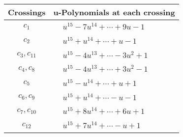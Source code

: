 \documentclass[1p]{elsarticle_modified}
\theoremstyle{definition}
\begin{document}
\begin{tabular}{m{50pt}|m{274pt}}
Crossings & \hspace{64pt}u-Polynomials at each crossing \\
\hline $$\begin{aligned}c_{1}\end{aligned}$$&$\begin{aligned}
&u^{15}-7 u^{14}+\cdots+9 u-1
\end{aligned}$\\
\hline $$\begin{aligned}c_{2}\end{aligned}$$&$\begin{aligned}
&u^{15}+u^{14}+\cdots+u-1
\end{aligned}$\\
\hline $$\begin{aligned}c_{3},c_{11}\end{aligned}$$&$\begin{aligned}
&u^{15}-4 u^{13}+\cdots-3 u^2+1
\end{aligned}$\\
\hline $$\begin{aligned}c_{4},c_{8}\end{aligned}$$&$\begin{aligned}
&u^{15}-4 u^{13}+\cdots+3 u^2-1
\end{aligned}$\\
\hline $$\begin{aligned}c_{5}\end{aligned}$$&$\begin{aligned}
&u^{15}- u^{14}+\cdots+u+1
\end{aligned}$\\
\hline $$\begin{aligned}c_{6},c_{9}\end{aligned}$$&$\begin{aligned}
&u^{15}+u^{14}+\cdots- u-1
\end{aligned}$\\
\hline $$\begin{aligned}c_{7},c_{10}\end{aligned}$$&$\begin{aligned}
&u^{15}+8 u^{14}+\cdots+6 u+1
\end{aligned}$\\
\hline $$\begin{aligned}c_{12}\end{aligned}$$&$\begin{aligned}
&u^{15}+7 u^{14}+\cdots- u+1
\end{aligned}$\\
\hline
\end{tabular}\\~\\
\end{document}
